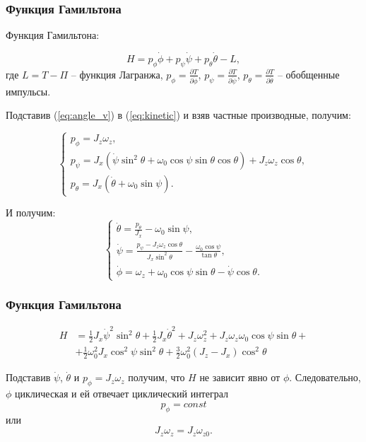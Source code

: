 \documentclass[10pt,pdf,hyperref={unicode}]{beamer}
\begin{document}
\begin{frame}
\frametitle{Функция Гамильтона}
	Функция Гамильтона:
	
	\begin{equation*}
		H = p_\phi \dot{\phi} + p_\psi \dot{\psi} + p_\theta \dot{\theta} - L,
	\end{equation*}
	где $L = T - \Pi$ – функция Лагранжа, $p_\phi = \frac{\partial{T}}{\partial{\dot{\phi}}}$, $p_\psi = \frac{\partial{T}}{\partial{\dot{\psi}}}$, $p_\theta = \frac{\partial{T}}{\partial{\dot{\theta}}}$ – обобщенные импульсы. 
	
	Подставив (\ref{eq:angle_v}) в (\ref{eq:kinetic}) и взяв частные производные, получим:
	
	\begin{equation*}
		\begin{cases}
			p_\phi = J_z \omega_z,\\
			p_\psi = J_x \left(\dot{\psi} \sin^2 \theta + \omega_0 \cos \psi \sin \theta \cos \theta \right) + J_z \omega_z \cos \theta, \\
			p_\theta = J_x \left(\dot{\theta} + \omega_0 \sin \psi \right).
		\end{cases}
	\end{equation*}
	
	И получим:
	\begin{equation*}
		\begin{cases}
			\dot{\theta} = \frac{p_\theta}{J_x} - \omega_0 \sin\psi, \\
			\dot{\psi} = \frac{p_\psi - J_z \omega_z \cos \theta}{J_x \sin^2 \theta} - \frac{\omega_0 \cos \psi}{\tan \theta},\\
			\dot{\phi} = \omega_z + \omega_0 \cos \psi \sin \theta - \dot{\psi} \cos \theta.
		\end{cases}
	\end{equation*}
\end{frame}

\begin{frame}
\frametitle{Функция Гамильтона}
	\begin{equation*}
		\begin{split}
			H &= \frac{1}{2} J_x \dot{\psi}^2 \sin^2 \theta + \frac{1}{2} J_x \dot{\theta}^2 + J_z \omega_z^2 +  J_z \omega_z \omega_0 \cos\psi \sin\theta + \\
			&+\frac{1}{2} \omega_0^2 J_x \cos^2\psi\sin^2\theta	+\frac{3}{2}  \omega_0^2 \left(J_z - J_x \right)\cos^2\theta
		\end{split}
	\end{equation*}	
	
	Подставив $\dot{\psi}$, $\dot{\theta}$ и $p_\phi = J_z \omega_z$ получим, что $H$ не зависит явно от $\phi$. Следовательно, $\phi$ циклическая и ей отвечает циклический интеграл
	\begin{equation*}
		p_\phi = const
	\end{equation*}
	или
	\begin{equation*}
		J_z \omega_z = J_z \omega_{z0}. 
	\end{equation*}
\end{frame}
\end{document}
